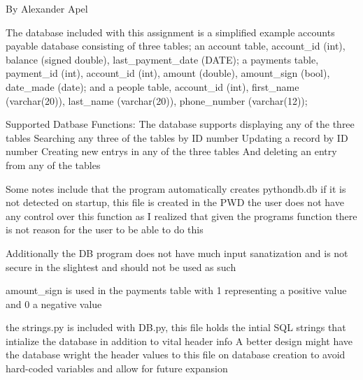 By Alexander Apel

The database included with this assignment is a simplified 
example accounts payable database consisting of three tables;
an account table, account_id (int), balance (signed double), last_payment_date (DATE);
a payments table, payment_id (int), account_id (int), amount (double), amount_sign (bool), date_made (date);
and a people table, account_id (int), first_name (varchar(20)), last_name (varchar(20)), phone_number (varchar(12));

Supported Datbase Functions:
	The database supports displaying any of the three tables
	Searching any three of the tables by ID number
	Updating a record by ID number
	Creating new entrys in any of the three tables
	And deleting an entry from any of the tables
	
	Some notes include that the program automatically creates pythondb.db
	if it is not detected on startup, this file is created in the PWD
	the user does not have any control over this function as I realized
	that given the programs function there is not reason for the user to
	be able to do this
	
	Additionally the DB program does not have much input sanatization 
	and is not secure in the slightest and should not be used as such
	
	amount_sign is used in the payments table with 1 representing a
	positive value and 0  a negative value
	
	the strings.py is included with DB.py, this file holds the intial SQL
	strings that intialize the database in addition to vital header info
	A better design might have the database wright the header values
	to this file on database creation to avoid hard-coded variables and
	allow for future expansion

